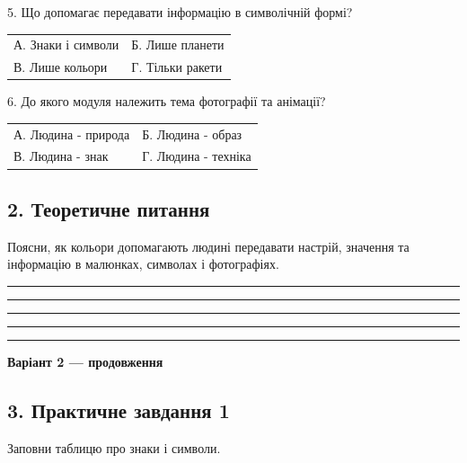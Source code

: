 \documentclass[11pt,a4paper]{article}
\begin{document}
\begin{minipage}{\linewidth}5. Що допомагає передавати інформацію в символічній формі?\par\begin{tabularx}{\linewidth}{@{}XX@{}}А. Знаки і символи & Б. Лише планети\\ В. Лише кольори & Г. Тільки ракети\end{tabularx}\end{minipage}\par

\begin{minipage}{\linewidth}6. До якого модуля належить тема фотографії та анімації?\par\begin{tabularx}{\linewidth}{@{}XX@{}}А. Людина - природа & Б. Людина - образ\\ В. Людина - знак & Г. Людина - техніка\end{tabularx}\end{minipage}\par

\subsection*{2. Теоретичне питання}

Поясни, як кольори допомагають людині передавати настрій, значення та інформацію в малюнках, символах і фотографіях.\par

\rule{0.96\linewidth}{0.4pt}\par

\rule{0.96\linewidth}{0.4pt}\par

\rule{0.96\linewidth}{0.4pt}\par

\rule{0.96\linewidth}{0.4pt}\par

\rule{0.96\linewidth}{0.4pt}\par

\newpage\textbf{Варіант 2 — продовження}\par

\subsection*{3. Практичне завдання 1}

Заповни таблицю про знаки і символи.\par
\end{document}
